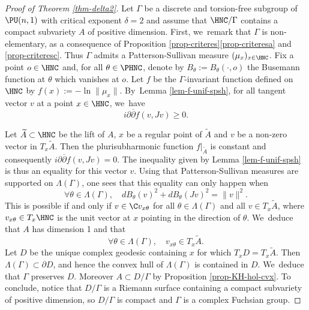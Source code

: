 \begin{proof}[Proof of Theorem \ref{thm-delta2}]
Let $\Gamma$ be a discrete and torsion-free subgroup of $\PU(n,1)$ with critical exponent $\delta=2$ and assume that $\HNC/\Gamma$ contains a compact subvariety $A$ of positive dimension.
First, we~remark that $\Gamma$ is non-elementary, as a consequence of Proposition \ref{prop-criteres}\eqref{prop-criteresa} and \eqref{prop-criteresc}. Thus $\Gamma$ admits a Patterson-Sullivan measure $(\mu_x)_{x\in \HNC}$. Fix a point $o\in \HNC$ and, for all $\theta\in \PHNC$, denote by $B_\theta:=B_{\theta}(\cdot,o)$ the Busemann function at $\theta$ which vanishes at $o$. Let ${f}$ be the $\Gamma$\nobreakdash-invariant function defined on $\HNC$ by $f(x):=-\ln \lVert \mu_x\rVert$. By~Lemma \ref{lem-f-unif-spsh}, for all tangent vector $v$ at a point $x\in \HNC$, we~have
\begin{equation*}
i\partial\overline{\partial}{f}(v,Jv) \ge 0.
\end{equation*}

Let $\widetilde{A}\subset \HNC$ be the lift of $A$, $x$ be a regular point of $\widetilde{A}$ and $v$ be a non-zero vector in $T_x\widetilde{A}$. Then the plurisubharmonic function ${f}\vert_{ \widetilde{A}}$ is constant and consequently $i\partial\overline{\partial}{f}(v,Jv) = 0$.
The inequality given by Lemma \ref{lem-f-unif-spsh} is thus an equality for this vector $v$. Using that Patterson-Sullivan measures are supported on $\Lambda(\Gamma)$, one sees that this equality can only happen when
\begin{equation*}
\forall \theta\in \Lambda(\Gamma),\quad dB_{\theta}(v)^{2}+dB_{\theta}(Jv)^{2} = \lVert v\rVert^{2}.
\end{equation*}
This is possible if and only if $v\in \C v_{x\theta}$ for all $\theta\in \Lambda(\Gamma)$ and all $v\in T_x\widetilde{A}$, where $v_{x\theta} \in T_x\HNC$ is the unit vector at $x$ pointing in the direction of $\theta$. We~deduce that $A$ has dimension 1 and that
\begin{equation*}
\forall \theta\in \Lambda(\Gamma),\quad v_{x\theta}\in T_x\widetilde{A}.
\end{equation*}
Let $D$ be the unique complex geodesic containing $x$ for which $T_xD=T_x\widetilde{A}$. Then $\Lambda(\Gamma)\subset \partial D$, and hence the convex hull of $\Lambda(\Gamma)$ is contained in $D$. We~deduce that $\Gamma$ preserves $D$. Moreover $A\subset D/\Gamma$ by Proposition \ref{prop-KH-hol-cvx}. To conclude, notice that $D/\Gamma$ is a Riemann surface containing a compact subvariety of positive dimension, so $D/\Gamma$ is compact and $\Gamma$ is a complex Fuchsian group.
\end{proof}

